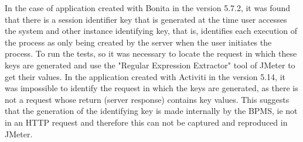 \documentclass[runningheads,a4paper]{llncs}
\begin{document}
In the case of application created with Bonita in the version 5.7.2, it was found that there is a session identifier key that is generated at the time user accesses the system and other instance identifying key, that is, identifies each execution of the process as only being created by the server when the user initiates the process. To run the tests, so it was necessary to locate the request in which these keys are generated and use the "Regular Expression Extractor" tool of JMeter to get their values. In the application created with Activiti in the version 5.14, it was impossible to identify the request in which the keys are generated, as there is not a request whose return (server response) contains key values. This suggests that the generation of the identifying key is made internally by the BPMS, ie not in an HTTP request and therefore this can not be captured and reproduced in JMeter.
\end{document}
